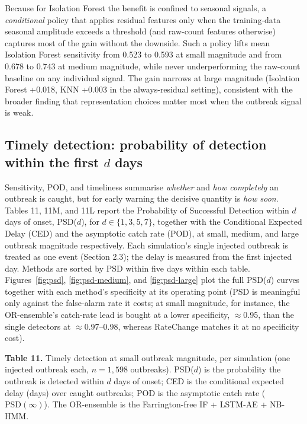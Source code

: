 \documentclass[11pt]{article}
\newcommand{\tabcap}[2]{\noindent\textbf{#1} #2\par\smallskip}
\begin{document}
Because for Isolation Forest the benefit is confined to seasonal signals, a \textit{conditional} policy that applies residual features only when the training-data seasonal amplitude exceeds a threshold (and raw-count features otherwise) captures most of the gain without the downside. Such a policy lifts mean Isolation Forest sensitivity from 0.523 to 0.593 at small magnitude and from 0.678 to 0.743 at medium magnitude, while never underperforming the raw-count baseline on any individual signal. The gain narrows at large magnitude (Isolation Forest +0.018, KNN +0.003 in the always-residual setting), consistent with the broader finding that representation choices matter most when the outbreak signal is weak.

\subsection{Timely detection: probability of detection within the first $d$ days}

Sensitivity, POD, and timeliness summarise \textit{whether} and \textit{how completely} an outbreak is caught, but for early warning the decisive quantity is \textit{how soon}. Tables 11, 11M, and 11L report the Probability of Successful Detection within $d$ days of onset, PSD($d$), for $d \in \{1,3,5,7\}$, together with the Conditional Expected Delay (CED) and the asymptotic catch rate (POD), at small, medium, and large outbreak magnitude respectively. Each simulation's single injected outbreak is treated as one event (Section 2.3); the delay is measured from the first injected day. Methods are sorted by PSD within five days within each table. Figures~\ref{fig:psd}, \ref{fig:psd-medium}, and \ref{fig:psd-large} plot the full PSD($d$) curves together with each method's specificity at its operating point (PSD is meaningful only against the false-alarm rate it costs; at small magnitude, for instance, the OR-ensemble's catch-rate lead is bought at a lower specificity, $\approx$0.95, than the single detectors at $\approx$0.97--0.98, whereas RateChange matches it at no specificity cost).

\tabcap{Table 11.}{Timely detection at small outbreak magnitude, per simulation (one injected outbreak each, $n = 1{,}598$ outbreaks). PSD($d$) is the probability the outbreak is detected within $d$ days of onset; CED is the conditional expected delay (days) over caught outbreaks; POD is the asymptotic catch rate ($\mathrm{PSD}(\infty)$). The OR-ensemble is the Farrington-free IF + LSTM-AE + NB-HMM.}
\end{document}
